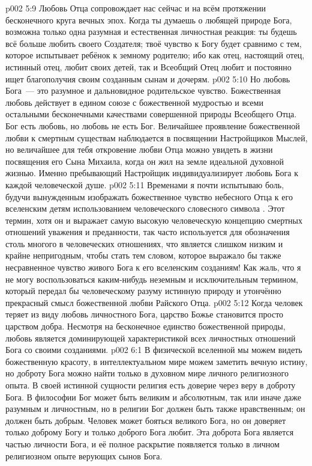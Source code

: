 \vs p002 5:9 Любовь Отца сопровождает нас сейчас и на всём протяжении бесконечного круга вечных эпох. Когда ты думаешь о любящей природе Бога, возможна только одна разумная и естественная личностная реакция: ты будешь всё больше любить своего Создателя; твоё чувство к Богу будет сравнимо с тем, которое испытывает ребёнок к земному родителю; ибо как отец, настоящий отец, истинный отец, любит своих детей, так и Всеобщий Отец любит и постоянно ищет благополучия своим созданным сынам и дочерям.
\vs p002 5:10 Но любовь Бога~--- это разумное и дальновидное родительское чувство. Божественная любовь действует в едином союзе с божественной мудростью и всеми остальными бесконечными качествами совершенной природы Всеобщего Отца. Бог есть любовь, но любовь не есть Бог. Величайшее проявление божественной любви к смертным существам наблюдается в посвящении Настройщиков Мыслей, но величайшее для тебя откровение любви Отца можно увидеть в жизни посвящения его Сына Михаила, когда он жил на земле идеальной духовной жизнью. Именно пребывающий Настройщик индивидуализирует любовь Бога к каждой человеческой душе.
\vs p002 5:11 \pc Временами я почти испытываю боль, будучи вынужденным изображать божественное чувство небесного Отца к его вселенским детям использованием человеческого словесного символа . Этот термин, хотя он и выражает самую высокую человеческую концепцию смертных отношений уважения и преданности, так часто используется для обозначения столь многого в человеческих отношениях, что является слишком низким и крайне непригодным, чтобы стать тем словом, которое выражало бы также несравненное чувство живого Бога к его вселенским созданиям! Как жаль, что я не могу воспользоваться каким\hyp{}нибудь неземным и исключительным термином, который передал бы человеческому разуму истинную природу и утончённо прекрасный смысл божественной любви Райского Отца.
\vs p002 5:12 \pc Когда человек теряет из виду любовь личностного Бога, царство Божье становится просто царством добра. Несмотря на бесконечное единство божественной природы, любовь является доминирующей характеристикой всех личностных отношений Бога со своими созданиями.
\vs p002 6:1 В физической вселенной мы можем видеть божественную красоту, в интеллектуальном мире можем заметить вечную истину, но доброту Бога можно найти только в духовном мире личного религиозного опыта. В своей истинной сущности религия есть доверие через веру в доброту Бога. В философии Бог может быть великим и абсолютным, так или иначе даже разумным и личностным, но в религии Бог должен быть также нравственным; он должен быть добрым. Человек может бояться великого Бога, но он доверяет только доброму Богу и только доброго Бога любит. Эта доброта Бога является частью личности Бога, и её полное раскрытие появляется только в личном религиозном опыте верующих сынов Бога.
